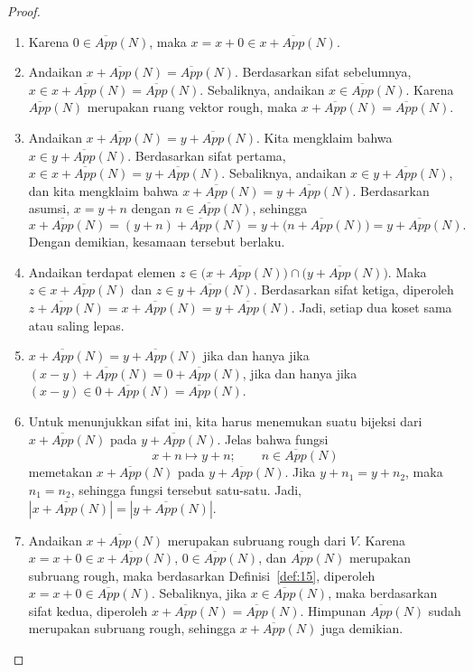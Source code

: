 \documentclass[a4paper,11pt]{article}
\theoremstyle{plain}
\newcommand{\upp}[1]{\overline{App}(#1)}
\begin{document}
\begin{proof}
      \leavevmode
      \begin{enumerate}
            \item Karena $0\in\upp{N}$, maka $x=x+0\in x+\upp{N}$.

            \item Andaikan $x+\upp{N}=\upp{N}$. Berdasarkan sifat sebelumnya,
                  $x\in x+\upp{N}=\upp{N}$. Sebaliknya, andaikan $x\in\upp{N}$.
                  Karena $\upp{N}$ merupakan ruang vektor rough, maka
                  $x+\upp{N}=\upp{N}$.

            \item Andaikan $x+\upp{N}=y+\upp{N}$. Kita mengklaim bahwa
                  $x\in y+\upp{N}$. Berdasarkan sifat pertama,
                  $x\in x+\upp{N}=y+\upp{N}$. Sebaliknya, andaikan
                  $x\in y+\upp{N}$, dan kita mengklaim bahwa
                  $x+\upp{N}=y+\upp{N}$. Berdasarkan asumsi, $x=y+n$ dengan
                  $n\in\upp{N}$, sehingga
                  \[
                        x+\upp{N}=(y+n)+\upp{N}
                        =y+\bigl(n+\upp{N}\bigr)=y+\upp{N}.
                  \]
                  Dengan demikian, kesamaan tersebut berlaku.

            \item Andaikan terdapat elemen
                  $z\in\bigl(x+\upp{N}\bigr)\cap\bigl(y+\upp{N}\bigr)$.
                  Maka $z\in x+\upp{N}$ dan $z\in y+\upp{N}$. Berdasarkan sifat
                  ketiga, diperoleh $z+\upp{N}=x+\upp{N}=y+\upp{N}$.
                  Jadi, setiap dua koset sama atau saling lepas.

            \item $x+\upp{N}=y+\upp{N}$ jika dan hanya jika
                  $(x-y)+\upp{N}=0+\upp{N}$, jika dan hanya jika
                  $(x-y)\in0+\upp{N}=\upp{N}$.

            \item Untuk menunjukkan sifat ini, kita harus menemukan suatu
                  bijeksi dari $x+\upp{N}$ pada $y+\upp{N}$. Jelas bahwa fungsi
                  \[
                        x+n\longmapsto y+n;\qquad n\in\upp{N}
                  \]
                  memetakan $x+\upp{N}$ pada $y+\upp{N}$. Jika $y+n_1=y+n_2$,
                  maka $n_1=n_2$, sehingga fungsi tersebut satu-satu. Jadi,
                  $|x+\upp{N}|=|y+\upp{N}|$.

            \item Andaikan $x+\upp{N}$ merupakan subruang rough dari $V$.
                  Karena $x=x+0\in x+\upp{N}$, $0\in\upp{N}$, dan
                  $\upp{N}$ merupakan subruang rough, maka berdasarkan
                  Definisi~\ref{def:15}, diperoleh $x=x+0\in\upp{N}$.
                  Sebaliknya, jika $x\in\upp{N}$, maka berdasarkan sifat kedua,
                  diperoleh $x+\upp{N}=\upp{N}$. Himpunan $\upp{N}$ sudah
                  merupakan subruang rough, sehingga $x+\upp{N}$ juga demikian.
      \end{enumerate}
\end{proof}
\end{document}
